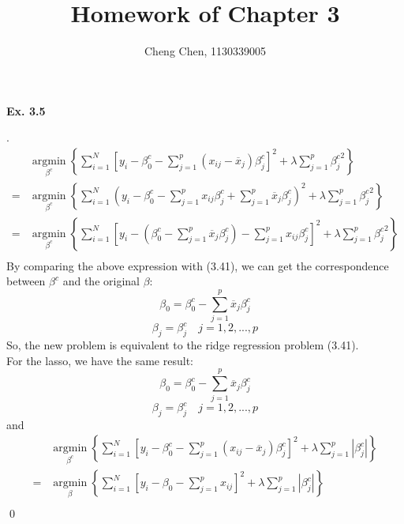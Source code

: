 \documentclass[12pt]{article}
\newenvironment{sol}
  {\par\vspace{3mm}\noindent{\it Solution}.}
  {\qed}
\begin{document}
\author{Cheng Chen, 1130339005}
\title{Homework of Chapter 3}
\maketitle

\begin{flushleft}
\textbf{Ex. 3.5}
\end{flushleft}

\begin{sol}
\begin{equation}
\nonumber
\begin{split}
&\mathop{argmin}\limits_{\beta^{c}}\left\{\sum^{N}_{i=1}[y_{i}-\beta^{c}_{0}-\sum^{p}_{j=1}(x_{ij}-\overline{x}_{j})\beta^{c}_{j}]^{2}+\lambda\sum^{p}_{j=1}{\beta^{c}_{j}}^{2}\right\}\\
=&\mathop{argmin}\limits_{\beta^{c}}\left\{\sum^{N}_{i=1}(y_{i}-\beta^{c}_{0}-\sum^{p}_{j=1}{x_{ij}\beta^{c}_{j}}+\sum^{p}_{j=1}\overline{x}_{j}\beta^{c}_{j})^{2}+\lambda\sum^{p}_{j=1}{\beta^{c}_{j}}^{2}\right\}\\
=&\mathop{argmin}\limits_{\beta^{c}}\left\{\sum^{N}_{i=1}[y_{i}-(\beta^{c}_{0}-\sum^{p}_{j=1}\overline{x}_{j}\beta^{c}_{j})-\sum^{p}_{j=1}x_{ij}\beta^{c}_{j}]^{2}+\lambda\sum^{p}_{j=1}{\beta^{c}_{j}}^{2}\right\}\\
\end{split}
\end{equation}
By comparing the above expression with (3.41), we can get the correspondence between $\beta^{c}$ and the original $\beta$:
$$\beta_{0}=\beta^{c}_{0}-\sum^{p}_{j=1}\overline{x}_{j}\beta^{c}_{j}$$
$$\beta_{j}=\beta^{c}_{j} \hspace{1em} j=1,2,...,p$$
So, the new problem is equivalent to the ridge regression problem (3.41).\\
For the lasso, we have the same result:
$$\beta_{0}=\beta^{c}_{0}-\sum^{p}_{j=1}\overline{x}_{j}\beta^{c}_{j}$$
$$\beta_{j}=\beta^{c}_{j} \hspace{1em} j=1,2,...,p$$
and
\begin{equation*}
\begin{split}
&\mathop{argmin}\limits_{\beta^{c}}\left\{\sum^{N}_{i=1}[y_{i}-\beta^{c}_{0}-\sum^{p}_{j=1}(x_{ij}-\overline{x}_{j})\beta^{c}_{j}]^{2}+\lambda\sum^{p}_{j=1}|\beta^{c}_{j}|\right\}\\
=&\mathop{argmin}\limits_{\beta}\left\{\sum^{N}_{i=1}[y_{i}-\beta_{0}-\sum^{p}_{j=1}x_{ij}]^{2}+\lambda\sum^{p}_{j=1}|\beta^{c}_{j}|\right\}\\
\end{split}
\end{equation*}
\end{sol}
\end{document}
